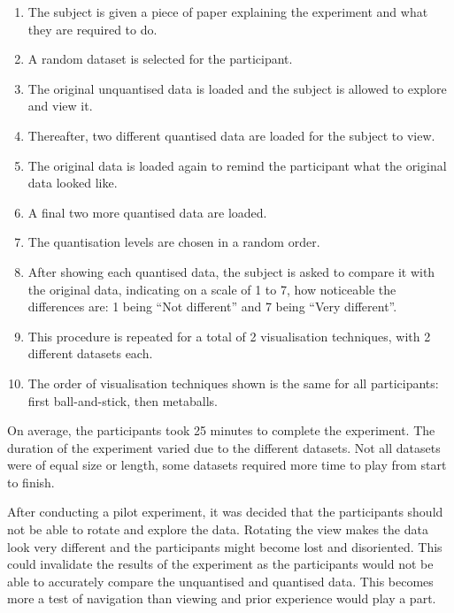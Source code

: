 \begin{enumerate}

  \item The subject is given a piece of paper explaining the experiment and
  what they are required to do.

  \item A random dataset is selected for the participant.

  \item The original unquantised data is loaded and the subject is allowed to
  explore and view it.

  \item Thereafter, two different quantised data are loaded for the subject to
  view.

  \item The original data is loaded again to remind the participant what the
  original data looked like.

  \item A final two more quantised data are loaded.

  \item The quantisation levels are chosen in a random order.

  \item After showing each quantised data, the subject is asked to compare it
  with the original data, indicating on a scale of 1 to 7, how noticeable the
  differences are: 1 being ``Not different'' and 7 being ``Very different''.

  \item This procedure is repeated for a total of 2 visualisation techniques,
  with 2 different datasets each.

  \item The order of visualisation techniques shown is the same for all
  participants: first ball-and-stick, then metaballs.

\end{enumerate}

On average, the participants took 25 minutes to complete the experiment. The
duration of the experiment varied due to the different datasets. Not all
datasets were of equal size or length, some datasets required more time to play
from start to finish.

After conducting a pilot experiment, it was decided that the participants
should not be able to rotate and explore the data. Rotating the view makes the
data look very different and the participants might become lost and
disoriented. This could invalidate the results of the experiment as the
participants would not be able to accurately compare the unquantised and
quantised data. This becomes more a test of navigation than viewing and prior
experience would play a part.

